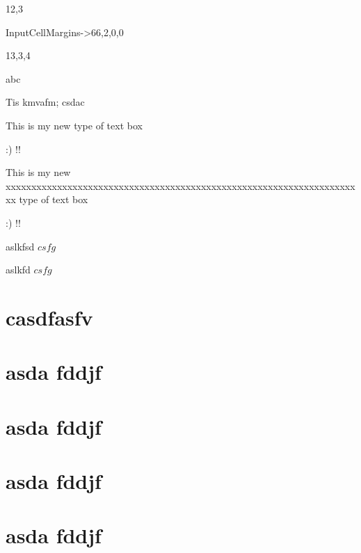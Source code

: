 12,3 

 InputCellMargins->{{66,2},{0,0}}

13,3,4 

















abc

















Tis kmvafm;
csdac



This is my
new type 
of  text
     box
     
     :)   !!

This is my
new  xxxxxxxxxxxxxxxxxxxxxxxxxxxxxxxxxxxxxxxxxxxxxxxxxxxxxxxxxxxxxxxxxxxxxx    type 
of  text
     box
     
     :)   !!

aslkfsd $ csfg$

aslkfd $ csfg$

\section{casdfasfv}

\section{asda fddjf }
\label{fredd}

\section{asda fddjf }
\label{fredd}

\section{asda fddjf }
\label{fredd}

\section{asda fddjf }
\label{fredd}





